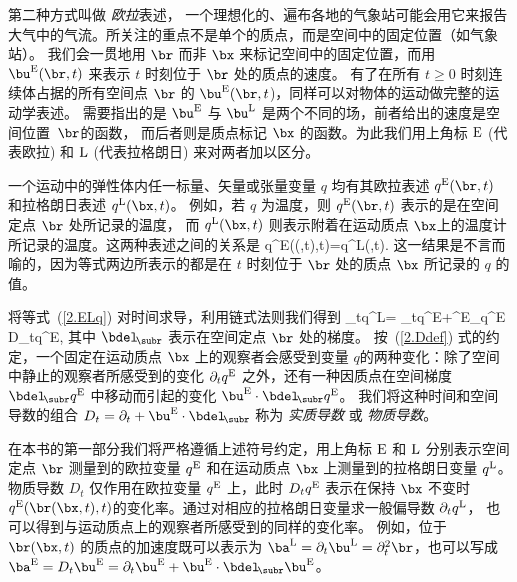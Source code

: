 第二种方式叫做 {\em 欧拉\/}表述，
一个理想化的、遍布各地的气象站可能会用它来报告大气中的气流。所关注的重点不是单个的质点，而是空间中的固定位置（如气象站）。
我们会一贯地用 $\br$ 而非 $\bx$ 来标记空间中的固定位置，而用
$\bu^{\rm E}(\br,t)$ 来表示 $t$ 时刻位于
$\br$ 处的质点的速度。
有了在所有 $t \geq 0$ 时刻连续体占据的所有空间点 $\br$  
的 $\bu^{\rm E}(\br,t$)，同样可以对物体的运动做完整的运动学表述。
需要指出的是 $\bu^{\rm E}$ 与
$\bu^{\rm L}$ 是两个不同的场，前者给出的速度是空间位置~$\br$的函数，
而后者则是质点标记 $\bx$ 的函数。为此我们用上角标 $\rm E$ (代表欧拉)
和 $\rm L$ (代表拉格朗日) 来对两者加以区分。

一个运动中的弹性体内任一标量、矢量或张量变量 $q$ 均有其欧拉表述 $q^{\rm E}(\br,t)$ 和拉格朗日表述 $q^{\rm L}(\bx,t)$。
例如，若 $q$ 为温度，则 $q^{\rm E}(\br,t)$
表示的是在空间定点 $\br$ 处所记录的温度，
而 $q^{\rm L}(\bx,t)$ 则表示附着在运动质点 $\bx$上的温度计所记录的温度。这两种表述之间的关系是
\eq
\label{2.ELq}
q^{\rm E}(\br(\bx,t),t)=q^{\rm L}(\bx,t).
\en
这一结果是不言而喻的，因为等式两边所表示的都是在 $t$ 时刻位于 $\br$
处的质点 $\bx$ 所记录的 $q$ 的值。

将等式~(\ref{2.ELq})
对时间求导，利用链式法则我们得到
\eq
\label{2.Ddef}
\partial_tq^{\rm L}=
\partial_tq^{\rm E}+\bu^{\rm E}\cdot\bdel_{\!\subr}q^{\rm E}
\equiv D_tq^{\rm E},
\en
其中 $\bdel_{\!\subr}$ 表示在空间定点 \nolinebreak[2] $\br$ 处的梯度。
%
%
按~(\ref{2.Ddef}) 式的约定，一个固定在运动质点 $\bx$ 上的观察者会感受到变量 $q$的两种变化：除了空间中静止的观察者所感受到的变化
 $\partial_tq^{\rm E}$ 之外，还有一种因质点在空间梯度
 $\bdel_{\!\subr}q^{\rm E}$ 
中移动而引起的变化 $\bu^{\rm E}\cdot\bdel_{\!\subr}q^{\rm E}$。
我们将这种时间和空间导数的组合
$D_t=\partial_t+\bu^{\rm E}\cdot\bdel_{\!\subr}$
称为 {\em 实质导数\/}
%
%
或 {\em 物质导数}。
%
%

在本书的第一部分我们将严格遵循上述符号约定，用上角标 $\rm E$ 和 $\rm L$ 分别表示空间定点 $\br$ 测量到的欧拉变量 $q^{\rm E}$ 和在运动质点 $\bx$ 
上测量到的拉格朗日变量 $q^{\rm L}$。
物质导数 $D_t$ 仅作用在欧拉变量 $q^{\rm E}$ 上，此时 $D_tq^{\rm E}$ 表示在保持 $\bx$ 不变时 $q^{\rm E}(\br(\bx,t),t)$的变化率。通过对相应的拉格朗日变量求一般偏导数 $\partial_tq^{\rm L}$，
也可以得到与运动质点上的观察者所感受到的同样的变化率。
例如，位于 $\br(\bx,t)$
的质点的加速度既可以表示为
$\ba^{\rm L}=\partial_t\bu^{\rm L}=\partial_t^2\br$，也可以写成 $\ba^{\rm E}=D_t\bu^{\rm E}=\partial_t\bu^{\rm E}+\bu^{\rm
E}\cdot\bdel_{\!\subr}\bu^{\rm E}$。

